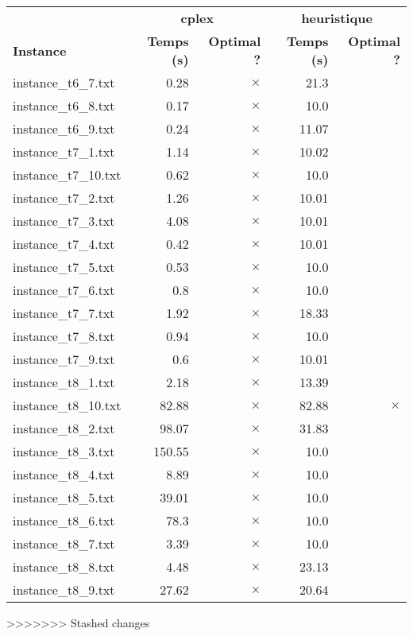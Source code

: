 \documentclass{article}
\begin{document}
\newpage
\begin{center}
\renewcommand{\arraystretch}{1.4} 
 \begin{tabular}{lrrrr}
	\hline
 & \multicolumn{2}{c}{\textbf{cplex}} & \multicolumn{2}{c}{\textbf{heuristique}}\\
\textbf{Instance}  & \textbf{Temps (s)} & \textbf{Optimal ?}  & \textbf{Temps (s)} & \textbf{Optimal ?} \\\hline

instance\_t6\_7.txt & 0.28 & 
$\times$
 & 21.3 & 
\\
instance\_t6\_8.txt & 0.17 & 
$\times$
 & 10.0 & 
\\
instance\_t6\_9.txt & 0.24 & 
$\times$
 & 11.07 & 
\\
instance\_t7\_1.txt & 1.14 & 
$\times$
 & 10.02 & 
\\
instance\_t7\_10.txt & 0.62 & 
$\times$
 & 10.0 & 
\\
instance\_t7\_2.txt & 1.26 & 
$\times$
 & 10.01 & 
\\
instance\_t7\_3.txt & 4.08 & 
$\times$
 & 10.01 & 
\\
instance\_t7\_4.txt & 0.42 & 
$\times$
 & 10.01 & 
\\
instance\_t7\_5.txt & 0.53 & 
$\times$
 & 10.0 & 
\\
instance\_t7\_6.txt & 0.8 & 
$\times$
 & 10.0 & 
\\
instance\_t7\_7.txt & 1.92 & 
$\times$
 & 18.33 & 
\\
instance\_t7\_8.txt & 0.94 & 
$\times$
 & 10.0 & 
\\
instance\_t7\_9.txt & 0.6 & 
$\times$
 & 10.01 & 
\\
instance\_t8\_1.txt & 2.18 & 
$\times$
 & 13.39 & 
\\
instance\_t8\_10.txt & 82.88 & 
$\times$
 & 82.88 & 
$\times$
\\
instance\_t8\_2.txt & 98.07 & 
$\times$
 & 31.83 & 
\\
instance\_t8\_3.txt & 150.55 & 
$\times$
 & 10.0 & 
\\
instance\_t8\_4.txt & 8.89 & 
$\times$
 & 10.0 & 
\\
instance\_t8\_5.txt & 39.01 & 
$\times$
 & 10.0 & 
\\
instance\_t8\_6.txt & 78.3 & 
$\times$
 & 10.0 & 
\\
instance\_t8\_7.txt & 3.39 & 
$\times$
 & 10.0 & 
\\
instance\_t8\_8.txt & 4.48 & 
$\times$
 & 23.13 & 
\\
instance\_t8\_9.txt & 27.62 & 
$\times$
 & 20.64 & 
\\
\hline\end{tabular}
\end{center}
>>>>>>> Stashed changes
\end{document}
